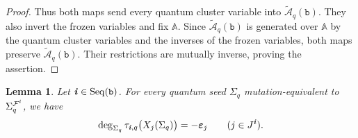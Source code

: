 \documentclass[12pt, leqno]{amsart}
\numberwithin{equation}{section}
\theoremstyle{plain}
\newtheorem{lemma}{Lemma}[section]
\theoremstyle{definition}
\newcommand{\ve}{\boldsymbol{\varepsilon}}
\newcommand{\ii}{ \textbf{\textit{i}}}
\newcommand{\bbA}{\mathbb{A}}
\newcommand{\calA}{\mathcal{A}}
\newcommand{\calF}{\mathcal{F}}
\newcommand{\tcalA}{\widetilde{\calA}}
\newcommand{\ttb}{\mathtt{b}}
\newcommand{\Seq}{\mathrm{Seq}}
\begin{document}
\begin{proof}
Thus both maps send every quantum cluster variable into
$\tcalA_q(\ttb)$.
They also invert the frozen variables and fix $\bbA$.
Since $\tcalA_q(\ttb)$ is generated over $\bbA$ by the quantum
cluster variables and the inverses of the frozen variables,
both maps preserve $\tcalA_q(\ttb)$.
Their restrictions are mutually inverse, proving the assertion.
\end{proof}

\begin{lemma}
\label{lem: normalized DT twist every seed}
Let $\ii\in\Seq(\ttb)$.
For every quantum seed $\Sigma_q$ mutation-equivalent to
$\Sigma_q^{\calF^\ii}$, we have
\begin{equation}
\deg_{\Sigma_q}
\tau_{\ii,q}\bigl(X_j(\Sigma_q)\bigr)=-\ve_j
\qquad(j\in J^\ii).
\label{eq: normalized DT twist every seed}
\end{equation}
\end{lemma}
\end{document}
